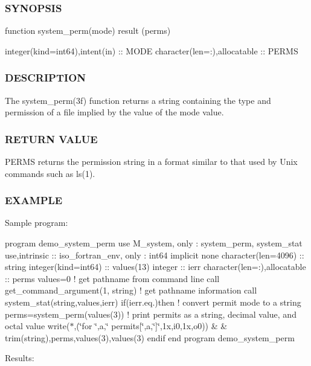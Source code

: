 \subsubsection*{S\+Y\+N\+O\+P\+S\+IS}

function system\+\_\+perm(mode) result (perms)

integer(kind=int64),intent(in) \+:\+: M\+O\+DE character(len=\+:),allocatable \+:\+: P\+E\+R\+MS

\subsubsection*{D\+E\+S\+C\+R\+I\+P\+T\+I\+ON}

\begin{DoxyVerb}The system_perm(3f) function returns a string containing the type
and permission of a file implied by the value of the mode value.
\end{DoxyVerb}


\subsubsection*{R\+E\+T\+U\+RN V\+A\+L\+UE}

P\+E\+R\+MS returns the permission string in a format similar to that used by Unix commands such as ls(1).

\subsubsection*{E\+X\+A\+M\+P\+LE}

Sample program\+:

program demo\+\_\+system\+\_\+perm use M\+\_\+system, only \+: system\+\_\+perm, system\+\_\+stat use,intrinsic \+:\+: iso\+\_\+fortran\+\_\+env, only \+: int64 implicit none character(len=4096) \+:\+: string integer(kind=int64) \+:\+: values(13) integer \+:\+: ierr character(len=\+:),allocatable \+:\+: perms values=0 ! get pathname from command line call get\+\_\+command\+\_\+argument(1, string) ! get pathname information call system\+\_\+stat(string,values,ierr) if(ierr.\+eq.)then ! convert permit mode to a string perms=system\+\_\+perm(values(3)) ! print permits as a string, decimal value, and octal value write($\ast$,\textquotesingle{}(\char`\"{}for \char`\"{},a,\char`\"{} permits\mbox{[}\char`\"{},a,\char`\"{}\mbox{]}\char`\"{},1x,i0,1x,o0)\textquotesingle{}) \& \& trim(string),perms,values(3),values(3) endif end program demo\+\_\+system\+\_\+perm

Results\+:

